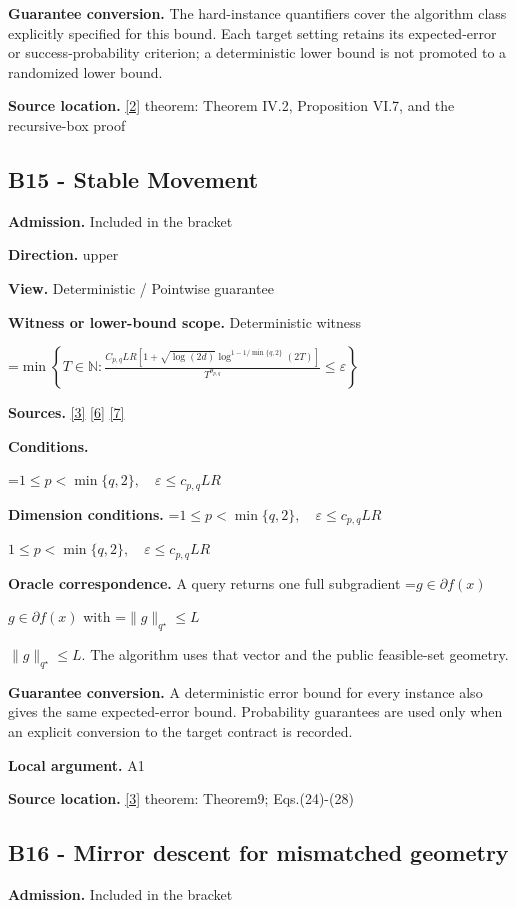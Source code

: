 \documentclass[10pt,a4paper]{article}
\newcommand{\AtlasMath}[1]{\par\begingroup\centering\setbox0=\hbox{$\displaystyle #1$}\ifdim\wd0>1.4\linewidth\typeout{ATLAS WIDE FORMULA: \the\wd0}\fi\ifdim\wd0>\linewidth\resizebox{\linewidth}{!}{\box0}\else\box0\fi\par\endgroup}
\newcommand{\AtlasInlineMath}[1]{\begingroup\setbox0=\hbox{$#1$}\ifdim\wd0>.4\linewidth\endgroup\AtlasMath{#1}\else\endgroup$#1$\fi}
\begin{document}
\textbf{Guarantee conversion.} The hard-instance quantifiers cover the algorithm class explicitly specified for this bound. Each target setting retains its expected-error or success-probability criterion; a deterministic lower bound is not promoted to a randomized lower bound.

\textbf{Source location.} \href{https://arxiv.org/pdf/1407.5144}{[2]} theorem: Theorem IV.2, Proposition VI.7, and the recursive-box proof

\subsection{B15 - Stable Movement}
\textbf{Admission.} Included in the bracket

\textbf{Direction.} upper

\textbf{View.} Deterministic / Pointwise guarantee

\textbf{Witness or lower-bound scope.} Deterministic witness

\AtlasMath{\min\left\{T\in\mathbb{N}:\frac{C_{p,q}LR[1+\sqrt{\log(2d)}\log^{1-1/\min\{q,2\}}(2T)]}{T^{\theta_{p,q}}}\le\varepsilon\right\}}
\textbf{Sources.} \href{https://arxiv.org/pdf/2609.20701}{[3]} \href{https://arxiv.org/pdf/1405.4980}{[6]} \href{https://www2.isye.gatech.edu/~nemirovs/MOR_AccuracyCertificates.pdf}{[7]}

\textbf{Conditions.} 
\AtlasMath{1\le p<\min\{q,2\},\quad\varepsilon\le c_{p,q}LR}


\textbf{Dimension conditions.} \AtlasInlineMath{1\le p<\min\{q,2\},\quad\varepsilon\le c_{p,q}LR}

\textbf{Oracle correspondence.} A query returns one full subgradient \AtlasInlineMath{g\in\partial f(x)} with \AtlasInlineMath{\|g\|_{q^\star}\le L}. The algorithm uses that vector and the public feasible-set geometry.

\textbf{Guarantee conversion.} A deterministic error bound for every instance also gives the same expected-error bound. Probability guarantees are used only when an explicit conversion to the target contract is recorded.

\textbf{Local argument.} A1

\textbf{Source location.} \href{https://arxiv.org/pdf/2609.20701}{[3]} theorem: Theorem9; Eqs.(24)-(28)

\subsection{B16 - Mirror descent for mismatched geometry}
\textbf{Admission.} Included in the bracket
\end{document}
